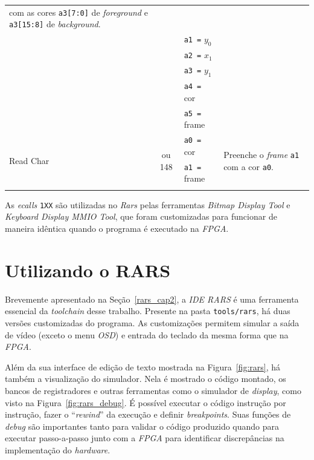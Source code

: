 \begin{longtable}{|l|c|p{3cm}|l |}
{{                                                com as cores \texttt{a3[7:0]} de \textit{foreground} e \texttt{a3[15:8]} de \textit{background}.}}\\*
            & & \texttt{a1 =} $y_0$       & \\*
            & & \texttt{a2 =} $x_1$       & \\*
            & & \texttt{a3 =} $y_1$       & \\*
            & & \texttt{a4 =} cor         & \\*
            & & \texttt{a5 =} frame       & \\
        \hline
        \multirow{3}{*}{Read Char}          & \multirow{3}{*}{\parbox{0.6cm}{ ou 148}}
            & \texttt{a0 =} cor           & \multirow{3}{*}{\parbox{7cm}{Preenche o \textit{frame} \texttt{a1} com a cor \texttt{a0}.}}\\*
            & & \texttt{a1 =} frame       & \\*
            & & & \\
        \hline
    \end{longtable}

    { As \textit{ecalls} \texttt{1XX} são utilizadas no \textit{Rars} pelas
        ferramentas \textit{Bitmap Display Tool} e \textit{Keyboard Display MMIO
        Tool}, que foram customizadas para funcionar de maneira idêntica quando
        o programa é executado na \textit{FPGA}.
    }


    \section{Utilizando o RARS}
    { Brevemente apresentado na Seção~\ref{rars_cap2}, a \textit{IDE RARS} é uma
        ferramenta essencial da \textit{toolchain} desse trabalho. Presente na
        pasta \texttt{tools/rars}, há duas versões customizadas do programa.
        As customizações permitem simular a saída de vídeo (exceto o menu \textit{OSD})
        e entrada do teclado da mesma forma que na \textit{FPGA}.
    }

    { Além da sua interface de edição de texto mostrada na Figura~\ref{fig:rars},
        há também a visualização do simulador. Nela é mostrado o código montado,
        os bancos de registradores e outras ferramentas como o simulador de
        \textit{display}, como visto na Figura~\ref{fig:rars_debug}. É possível
        executar o código instrução por instrução, fazer o ``\textit{rewind}''
        da execução e definir \textit{breakpoints}. Suas funções de \textit{debug}
        são importantes tanto para validar o código produzido quando para executar
        passo-a-passo junto com a \textit{FPGA} para identificar discrepâncias
        na implementação do \textit{hardware}.
    }

